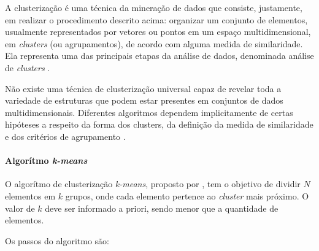 A clusterização é uma técnica da mineração de dados que consiste, justamente, em realizar o procedimento descrito acima: organizar um conjunto de elementos, usualmente representados por vetores ou pontos em um espaço multidimensional, em \textit{clusters} (ou agrupamentos), de acordo com alguma medida de similaridade. Ela representa uma das principais etapas da análise de dados, denominada análise de \textit{clusters} \cite{jain1999}.

Não existe uma técnica de clusterização universal capaz de revelar toda a variedade de estruturas que podem estar presentes em conjuntos de dados multidimensionais. Diferentes algoritmos dependem implicitamente de certas hipóteses a respeito da forma dos clusters, da definição da medida de similaridade e dos critérios de agrupamento \cite{estivill2002}.

\paragraph{Algorítmo \textit{k-means}}
\label{sub:k_means}

O algorítmo de clusterização \textit{k-means}, proposto por , tem o objetivo de dividir \(N\) elementos em \(k\) grupos, onde cada elemento pertence ao \textit{cluster} mais próximo. O valor de \(k\) deve ser informado a priori, sendo menor que a quantidade de elementos.

Os passos do algoritmo são:

